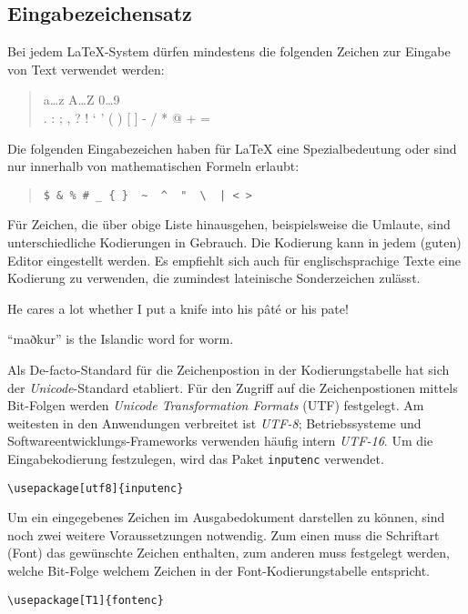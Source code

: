 \subsection{Eingabezeichensatz}\label{inputenc}

Bei jedem \LaTeX-System dürfen mindestens die folgenden Zeichen zur Eingabe von
Text verwendet werden:
\begin{quote}
  \ttfamily
  a\dots z A\dots Z 0\dots 9 \\
  . : ; , ? ! ` ' ( ) [ ] - / * @ + =
\end{quote}
Die folgenden Eingabezeichen haben für \LaTeX{} eine Spezialbedeutung oder sind
nur innerhalb von mathematischen Formeln erlaubt:
\begin{quote}
\verb.$ & % # _ { }  ~  ^  "  \  | < >.
\end{quote}
Für Zeichen, die über obige Liste hinausgehen, beispielsweise die Umlaute, sind
unterschiedliche Kodierungen in Gebrauch.
Die Kodierung kann in jedem (guten) Editor eingestellt werden. Es empfiehlt sich auch für englischsprachige Texte eine Kodierung zu verwenden, die zumindest lateinische Sonderzeichen zulässt.

\begin{LTXexample}
He cares a lot whether
I put a knife into
his pâté or his pate!

``maðkur'' is the
Islandic word for worm.
\end{LTXexample}


Als De-facto-Standard für die Zeichenpostion in der Kodierungstabelle hat sich der \emph{Unicode}-Standard etabliert. Für den Zugriff auf die Zeichenpostionen mittels Bit-Folgen werden \emph{Unicode Transformation Formats} (UTF) festgelegt. Am weitesten in den Anwendungen verbreitet ist \emph{UTF-8}; Betriebssysteme und Softwareentwicklungs-Frameworks verwenden häufig intern \emph{UTF-16}. Um die Eingabekodierung festzulegen, wird das Paket \texttt{inputenc} verwendet.

\begin{beispiel}
\lstinline+\usepackage[utf8]{inputenc}+
\end{beispiel}

Um ein eingegebenes Zeichen im Ausgabedokument darstellen zu können, sind noch zwei weitere Voraussetzungen notwendig. Zum einen muss die Schriftart (Font) das gewünschte Zeichen enthalten, zum anderen muss festgelegt werden, welche Bit-Folge welchem Zeichen in der Font-Kodierungstabelle entspricht.

\begin{beispiel}
\lstinline+\usepackage[T1]{fontenc}+
\end{beispiel}

